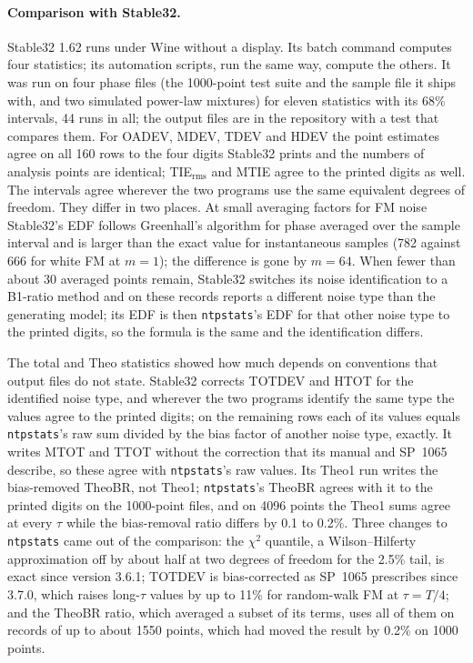 \documentclass[11pt,a4paper]{article}
\newcommand{\ntp}{\texttt{ntpstats}}
\begin{document}
\paragraph{Comparison with Stable32.} Stable32 1.62 \citep{stable32} runs under Wine without a
display. Its batch command computes four statistics; its automation scripts, run the same way, compute
the others. It was run on four phase files (the 1000-point test suite and the sample file it ships with,
and two simulated power-law mixtures) for eleven statistics with its 68\% intervals, 44 runs in all; the
output files are in the repository with a test that compares them. For OADEV, MDEV, TDEV and HDEV the
point estimates agree on all 160 rows to the four digits Stable32 prints and the numbers of analysis
points are identical; TIE$_\mathrm{rms}$ and MTIE agree to the printed digits as well. The intervals agree
wherever the two programs use the same equivalent degrees of freedom. They differ in two places. At small
averaging factors for FM noise Stable32's EDF follows Greenhall's algorithm for phase averaged over the
sample interval and is larger than the exact value for instantaneous samples (782 against 666 for white
FM at $m = 1$); the difference is gone by $m = 64$. When fewer than about 30 averaged points remain,
Stable32 switches its noise identification to a B1-ratio method and on these records reports a
different noise type than the generating model; its EDF is then \ntp's EDF for that other noise type to
the printed digits, so the formula is the same and the identification differs.

The total and Theo statistics showed how much depends on conventions that output files do not state.
Stable32 corrects TOTDEV and HTOT for the identified noise type, and wherever the two programs identify
the same type the values agree to the printed digits; on the remaining rows each of its values equals
\ntp's raw sum divided by the bias factor of another noise type, exactly. It writes MTOT and TTOT
without the correction that its manual and SP~1065 describe, so these agree with \ntp's raw values.
Its Theo1 run writes the bias-removed TheoBR, not Theo1; \ntp's TheoBR agrees with it to the printed
digits on the 1000-point files, and on 4096 points the Theo1 sums agree at every $\tau$ while the
bias-removal ratio differs by 0.1 to 0.2\%. Three changes to \ntp{} came out of the comparison: the
$\chi^2$ quantile, a Wilson--Hilferty approximation off by about half at two degrees of freedom for the
2.5\% tail, is exact since version 3.6.1; TOTDEV is bias-corrected as SP~1065 prescribes since 3.7.0,
which raises long-$\tau$ values by up to 11\% for random-walk FM at $\tau = T/4$; and the TheoBR ratio,
which averaged a subset of its terms, uses all of them on records of up to about 1550 points, which had
moved the result by 0.2\% on 1000 points.
\end{document}
